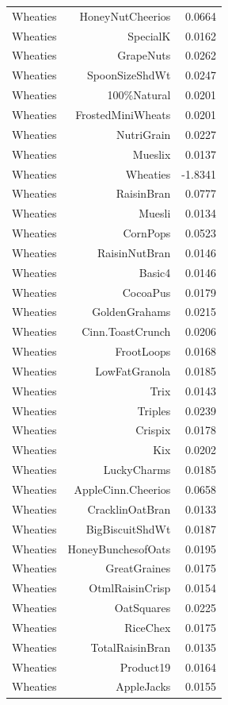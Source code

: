 \begin{longtable}{@{}lrr@{}}
Wheaties & HoneyNutCheerios & 0.0664 \\
Wheaties & SpecialK & 0.0162 \\
Wheaties & GrapeNuts & 0.0262 \\
Wheaties & SpoonSizeShdWt & 0.0247 \\
Wheaties & 100\%Natural & 0.0201 \\
Wheaties & FrostedMiniWheats & 0.0201 \\
Wheaties & NutriGrain & 0.0227 \\
Wheaties & Mueslix & 0.0137 \\
Wheaties & Wheaties & -1.8341 \\
Wheaties & RaisinBran & 0.0777 \\
Wheaties & Muesli & 0.0134 \\
Wheaties & CornPops & 0.0523 \\
Wheaties & RaisinNutBran & 0.0146 \\
Wheaties & Basic4 & 0.0146 \\
Wheaties & CocoaPus & 0.0179 \\
Wheaties & GoldenGrahams & 0.0215 \\
Wheaties & Cinn.ToastCrunch & 0.0206 \\
Wheaties & FrootLoops & 0.0168 \\
Wheaties & LowFatGranola & 0.0185 \\
Wheaties & Trix & 0.0143 \\
Wheaties & Triples & 0.0239 \\
Wheaties & Crispix & 0.0178 \\
Wheaties & Kix & 0.0202 \\
Wheaties & LuckyCharms & 0.0185 \\
Wheaties & AppleCinn.Cheerios & 0.0658 \\
Wheaties & CracklinOatBran & 0.0133 \\
Wheaties & BigBiscuitShdWt & 0.0187 \\
Wheaties & HoneyBunchesofOats & 0.0195 \\
Wheaties & GreatGraines & 0.0175 \\
Wheaties & OtmlRaisinCrisp & 0.0154 \\
Wheaties & OatSquares & 0.0225 \\
Wheaties & RiceChex & 0.0175 \\
Wheaties & TotalRaisinBran & 0.0135 \\
Wheaties & Product19 & 0.0164 \\
Wheaties & AppleJacks & 0.0155 \\

\end{longtable}
